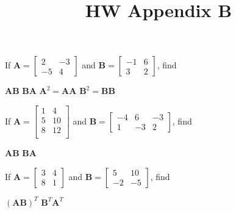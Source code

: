 \documentclass[chapter=2,section=1]{math252homework}
\title{HW Appendix B}
\begin{document}
\begin{problems}[start=3]
	\problem If $\mathbf{A}=\left[ \begin{array}{cc}
		2 & -3\\
		-5 & 4
	\end{array} \right]$ and $\mathbf{B}=\left[ \begin{array}{cc}
		-1 & 6\\
		3 & 2
	\end{array} \right]$, find
	\begin{problems}
		\subproblem $\mathbf{A}\mathbf{B}$						%
		\subproblem $\mathbf{B}\mathbf{A}$						%
		\subproblem $\mathbf{A}^{2}=\mathbf{A}\mathbf{A}$		%
		\subproblem $\mathbf{B}^{2}=\mathbf{B}\mathbf{B}$		%
	\end{problems}
	\problem If $\mathbf{A}=\left[ \begin{array}{cc}
		1 & 4\\
		5 & 10\\
		8 & 12\\
	\end{array} \right]$ and $\mathbf{B}=\left[ \begin{array}{ccc}
		-4 & 6 & -3\\
		1 & -3 & 2
	\end{array} \right]$, find
	\begin{problems}
		\subproblem $\mathbf{A}\mathbf{B}$						%
		\subproblem $\mathbf{B}\mathbf{A}$						%
	\end{problems}
	\setcounter{problemsi}{8}
	\problem If $\mathbf{A}=\left[ \begin{array}{cc}
		3 & 4\\
		8 & 1
	\end{array} \right]$ and $\mathbf{B}=\left[ \begin{array}{cc}
		5 & 10\\
		-2 & -5
	\end{array} \right]$, find
	\begin{problems}
		\subproblem $(\mathbf{A}\mathbf{B})^{T}$						%
		\subproblem $\mathbf{B}^{T}\mathbf{A}^{T}$						%
	\end{problems}

\end{problems}
\end{document}
